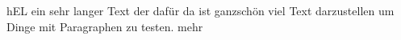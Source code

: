 \documentclass[11pt]{article}
\begin{document}
\pagestyle{fancy} %
\fancyhf{} %



\fancyfoot{}
\fancyfoot[C]{
    \hfill \break{}
    \thepage{}
}

hEL ein sehr langer Text der dafür da ist ganzschön viel Text darzustellen um Dinge mit Paragraphen zu testen.
mehr
\end{document}
